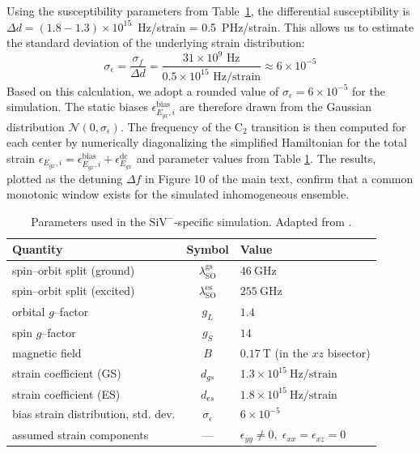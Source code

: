 Using the susceptibility parameters from Table~\ref{tab:simparams}, the differential susceptibility is $\Delta d = (1.8 - 1.3) \times 10^{15}$~Hz/strain = 0.5~PHz/strain. This allows us to estimate the standard deviation of the underlying strain distribution:
\begin{equation}
    \sigma_{\epsilon} = \frac{\sigma_f}{\Delta d} = \frac{31 \times 10^9 \text{ Hz}}{0.5 \times 10^{15} \text{ Hz/strain}} \approx 6 \times 10^{-5}
\end{equation}
Based on this calculation, we adopt a rounded value of $\sigma_\epsilon = 6 \times 10^{-5}$ for the simulation. The static biases $\epsilon_{E_{gx},i}^{\text{bias}}$ are therefore drawn from the Gaussian distribution $\mathcal{N}(0, \sigma_\epsilon)$. The frequency of the \(\mathrm{C}_2\) transition is then computed for each center by numerically diagonalizing the simplified Hamiltonian for the total strain $\epsilon_{E_{gx},i} = \epsilon_{E_{gx},i}^{\text{bias}} + \epsilon_{E_{gx}}^{\text{dc}}$ and parameter values from Table \ref{tab:simparams}. The results, plotted as the detuning $\Delta f$ in Figure 10 of the main text, confirm that a common monotonic window exists for the simulated inhomogeneous ensemble.

\begingroup
 \renewcommand{\thetable}{S\arabic{table}}
 \setcounter{table}{0}
 \begin{table}[h!]
    \centering
    \vspace{4pt}
    \begin{tabular}{|l|c|l|}
      \hline
      \textbf{Quantity} & \textbf{Symbol} & \textbf{Value} \\ \hline
      spin–orbit split (ground)   & \(\lambda^{\text{gs}}_{\text{SO}}\) & \(46~\mathrm{GHz}\) \\
      spin–orbit split (excited)  & \(\lambda^{\text{es}}_{\text{SO}}\) & \(255~\mathrm{GHz}\) \\
      orbital \(g\)--factor       & \(g_L\)                         & \(1.4\) \\
      spin \(g\)--factor          & \(g_S\)                         & \(14\) \\
      magnetic field              & \(B\)                           & \(0.17~\mathrm{T}\) (in the \(xz\) bisector) \\
      strain coefficient (GS)     & \(d_{gs}\)                      & \(1.3\times10^{15}~\mathrm{Hz/strain}\) \\
      strain coefficient (ES)     & \(d_{es}\)                      & \(1.8\times10^{15}~\mathrm{Hz/strain}\) \\
      bias strain distribution, std. dev. & \(\sigma_\epsilon\)             & \(6\times10^{-5}\) \\
      assumed strain components   & ---                             & \(\epsilon_{yy}\neq0,\; \epsilon_{xx}=\epsilon_{xz}=0\) \\
      \hline
    \end{tabular}
    \caption{Parameters used in the \(\mathrm{SiV}^{-}\)-specific simulation. Adapted from \cite{PhysRevB.97.205444}.}
    \label{tab:simparams}
 \end{table}
\endgroup

